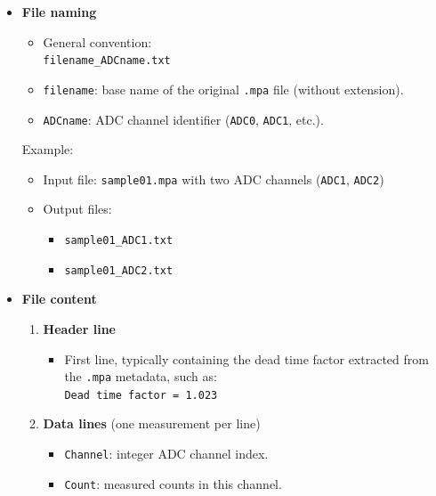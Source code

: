 \begin{itemize}
\item
  \textbf{File naming}

  \begin{itemize}
  \tightlist
  \item
    General convention:\\
    \texttt{filename\_ADCname.txt}~\\
  \item
    \texttt{filename}: base name of the original \texttt{.mpa} file
    (without extension).\\
  \item
    \texttt{ADCname}: ADC channel identifier (\texttt{ADC0},
    \texttt{ADC1}, etc.).
  \end{itemize}

  Example:

  \begin{itemize}
  \tightlist
  \item
    Input file: \texttt{sample01.mpa} with two ADC channels
    (\texttt{ADC1}, \texttt{ADC2})\\
  \item
    Output files:

    \begin{itemize}
    \tightlist
    \item
      \texttt{sample01\_ADC1.txt}~\\
    \item
      \texttt{sample01\_ADC2.txt}
    \end{itemize}
  \end{itemize}
\item
  \textbf{File content}

  \begin{enumerate}
  \def\labelenumi{\arabic{enumi}.}
  \tightlist
  \item
    \textbf{Header line}

    \begin{itemize}
    \tightlist
    \item
      First line, typically containing the dead time factor extracted
      from the \texttt{.mpa} metadata, such as:\\
      \texttt{Dead\ time\ factor\ =\ 1.023}
    \end{itemize}
  \item
    \textbf{Data lines} (one measurement per line)

    \begin{itemize}
    \tightlist
    \item
      \texttt{Channel}: integer ADC channel index.\\
    \item
      \texttt{Count}: measured counts in this channel.
    \end{itemize}
  \end{enumerate}
\end{itemize}

